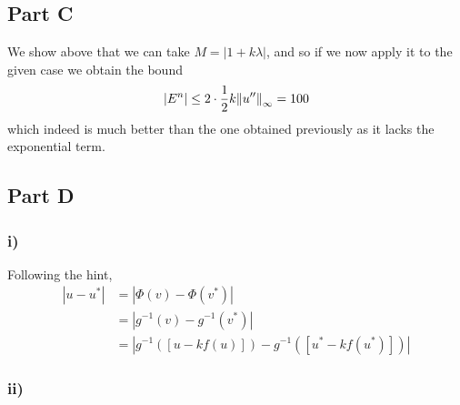 \documentclass[12pt]{article}
\begin{document}
\subsection*{Part C}
We show above that we can take $M = |1+k\lambda|$, and so if we now apply it to the given case we obtain the bound
\begin{align}
    |E^{n}| \le 2\cdot \dfrac{1}{2}k\norm{u^{\prime\prime}}_{\infty} = 100
\end{align}
which indeed is much better than the one obtained previously as it lacks the exponential term. 

\subsection*{Part D}

\subsubsection*{i)}
Following the hint, 
\begin{subequations}
    \begin{align}
        |u-u^{*}| &= |\Phi(v) - \Phi(v^{*})|\\
        &= |g^{-1}(v) - g^{-1}(v^{*})|\\
        &= |g^{-1}\left(\left[u-kf(u)\right]\right) - g^{-1}\left(\left[u^{*}-kf(u^{*})\right]\right)|
    \end{align}
\end{subequations}

\subsubsection*{ii)}
\end{document}
